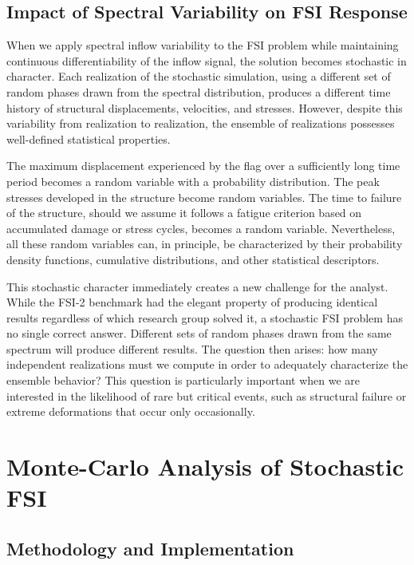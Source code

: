 ﻿\documentclass[a4paper,11pt]{article}
\theoremstyle{definition}
\begin{document}
\subsection{Impact of Spectral Variability on FSI Response}

When we apply spectral inflow variability to the FSI problem while maintaining continuous differentiability of the inflow signal, the solution becomes stochastic in character. Each realization of the stochastic simulation, using a different set of random phases drawn from the spectral distribution, produces a different time history of structural displacements, velocities, and stresses. However, despite this variability from realization to realization, the ensemble of realizations possesses well-defined statistical properties.

The maximum displacement experienced by the flag over a sufficiently long time period becomes a random variable with a probability distribution. The peak stresses developed in the structure become random variables. The time to failure of the structure, should we assume it follows a fatigue criterion based on accumulated damage or stress cycles, becomes a random variable. Nevertheless, all these random variables can, in principle, be characterized by their probability density functions, cumulative distributions, and other statistical descriptors.

This stochastic character immediately creates a new challenge for the analyst. While the FSI-2 benchmark had the elegant property of producing identical results regardless of which research group solved it, a stochastic FSI problem has no single correct answer. Different sets of random phases drawn from the same spectrum will produce different results. The question then arises: how many independent realizations must we compute in order to adequately characterize the ensemble behavior? This question is particularly important when we are interested in the likelihood of rare but critical events, such as structural failure or extreme deformations that occur only occasionally.

\section{Monte-Carlo Analysis of Stochastic FSI}

\subsection{Methodology and Implementation}
\end{document}
